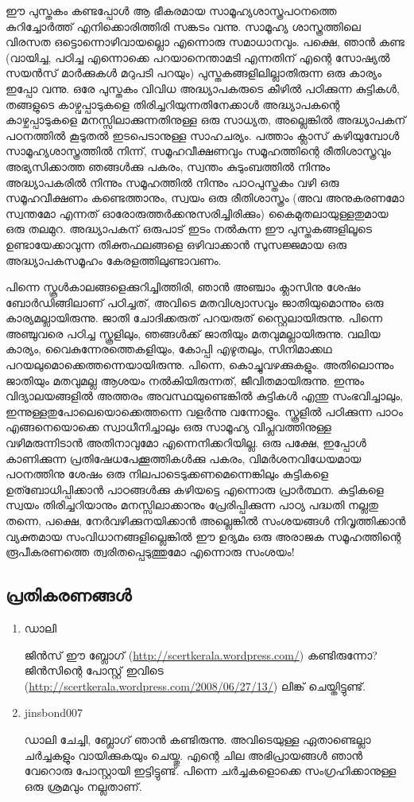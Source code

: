 ഈ പുസ്തകം കണ്ടപ്പോള്‍ ആ ഭീകരമായ സാമൂഹ്യശാസ്ത്രപഠനത്തെ കുറിച്ചോര്‍ത്ത് എനിക്കൊരിത്തിരി സങ്കടം വന്നു. സാമൂഹ്യ ശാസ്ത്രത്തിലെ വിരസത ഒട്ടൊന്നൊഴിവായല്ലൊ 
എന്നൊരു സമാധാനവും. പക്ഷെ, ഞാന്‍ കണ്ട (വായിച്ച, പഠിച്ച എന്നൊക്കെ പറയാനെന്താമടി എന്നതിന് എന്റെ സോഷ്യല്‍ സയന്‍സ് മാര്‍ക്കുകള്‍ മറുപടി പറയും) 
പുസ്തകങ്ങളിലില്ലാതിരുന്ന ഒരു കാര്യം ഇപ്പോ വന്നു. ഒരേ പുസ്തകം വിവിധ അദ്ധ്യാപകരുടെ കീഴില്‍ പഠിക്കുന്ന കുട്ടികള്‍, തങ്ങളുടെ കാഴ്വപ്പാടുകളെ തിരിച്ചറിയുന്നതിനേക്കാള്‍ 
അദ്ധ്യാപകന്റെ കാഴ്ചപ്പാടുകളെ മനസ്സിലാക്കുന്നതിനുള്ള ഒരു സാധ്യത, അല്ലെങ്കില്‍ അദ്ധ്യാപകന് പഠനത്തില്‍ കൂടുതല്‍ ഇടപെടാനുള്ള സാഹചര്യം. പത്താം ക്ലാസ് 
കഴിയുമ്പോള്‍ സാമൂഹ്യശാസ്ത്രത്തില്‍ നിന്ന്, സമൂഹവീക്ഷണവും സമൂഹത്തിന്റെ രീതിശാസ്ത്രവും അഭ്യസിക്കാത്ത ഞങ്ങള്‍ക്കു പകരം, സ്വന്തം കുടുംബത്തില്‍ നിന്നും 
അദ്ധ്യാപകരില്‍ നിന്നും സമൂഹത്തില്‍ നിന്നും പാഠപുസ്തകം വഴി ഒരു സമൂഹവീക്ഷണം കണ്ടെത്താനും, സ്വയം ഒരു രീതിശാസ്ത്രം (അവ അനുകരണമോ സ്വന്തമോ എന്നത് 
ഓരോരുത്തര്‍ക്കനുസരിച്ചിരിക്കും) കൈമുതലായുള്ളതുമായ ഒരു തലമുറ. അദ്ധ്യാപകന് ഒരുപാട് ഇടം നല്‍കുന്ന ഈ പുസ്തകങ്ങളിലൂടെ ഉണ്ടായേക്കാവുന്ന 
തിക്തഫലങ്ങളെ ഒഴിവാക്കാന്‍ സുസജ്ജമായ ഒരു അദ്ധ്യാപകസമൂഹം കേരളത്തിലുണ്ടാവണം.

പിന്നെ സ്കൂള്‍കാലങ്ങളെക്കുറിച്ചിത്തിരി, ഞാന്‍ അഞ്ചാം ക്ലാസിനു ശേഷം ബോര്‍ഡിങ്ങിലാണ് പഠിച്ചത്, അവിടെ മതവിശ്വാസവും ജാതിയുമൊന്നും ഒരു കാര്യമല്ലായിരുന്നു. 
ജാതി ചോദിക്കരുത് പറയരുത് സ്റ്റൈലായിരുന്നു. പിന്നെ അഞ്ചുവരെ പഠിച്ച സ്കൂളിലും, ഞങ്ങള്‍ക്ക് ജാതിയും മതവുമല്ലായിരുന്നു. വലിയ കാര്യം, വൈകുന്നേരത്തെകളിയും, 
കോപ്പി എഴുതലും, സിനിമാക്കഥ പറയലുമൊക്കെത്തന്നെയായിരുന്നു. പിന്നെ, കൊച്ചുവഴക്കുകളും. അതിലൊന്നും ജാതിയും മതവുമല്ല ആശയം നല്‍കിയിരുന്നത്, ജീവിതമായിരുന്നു. 
ഇന്നും വിദ്യാലയങ്ങളില്‍ അത്തരം അവസ്ഥയുണ്ടെങ്കില്‍ കുട്ടികള്‍ എന്തു സംഭവിച്ചാലും, ഇന്നുള്ളതുപോലെയൊക്കെത്തന്നെ വളര്‍ന്നു വന്നോളും. സ്കൂളില്‍ പഠിക്കുന്ന പാഠം 
എങ്ങനെയൊക്കെ സ്വാധീനിച്ചാലും ഒരു സാമൂഹ്യ വിപ്ലവത്തിനുള്ള വഴിമരുന്നിടാന്‍ അതിനാവുമോ എന്നെനിക്കറിയില്ല. ഒരു പക്ഷേ, ഇപ്പോള്‍ കാണിക്കുന്ന 
പ്രതിഷേധപേക്കൂത്തികള്‍ക്കു പകരം, വിമര്‍ശനവിധേയമായ പഠനത്തിനു ശേഷം ഒരു നിലപാടെടുക്കണമെന്നെങ്കിലും കുട്ടികളെ ഉത്ബോധിപ്പിക്കാന്‍ പാഠങ്ങള്‍ക്കു കഴിയട്ടെ 
എന്നൊരു പ്രാര്‍ത്ഥന. കുട്ടികളെ സ്വയം തിരിച്ചറിയാനും മനസ്സിലാക്കാനും പ്രേരിപ്പിക്കുന്ന പാഠ്യ പദ്ധതി നല്ലതു തന്നെ, പക്ഷെ, നേര്‍വഴിക്കുനയിക്കാന്‍ അല്ലെങ്കില്‍ 
സംശയങ്ങള്‍ നിവൃത്തിക്കാന്‍ വ്യക്തമായ സംവിധാനങ്ങളില്ലെങ്കില്‍ ഈ ഉദ്യമം ഒരു അരാജക സമൂഹത്തിന്റെ രൂപീകരണത്തെ ത്വരിതപ്പെടുത്തുമോ എന്നൊരു സംശയം!

\subsection*{പ്രതികരണങ്ങള്‍}

\begin{enumerate}
 \item{ഡാലി}

ജിന്‍സ് ഈ ബ്ലോഗ് (\url{http://scertkerala.wordpress.com/}) കണ്ടിരുന്നോ?  ജിന്‍സിന്റെ പോസ്റ്റ് 
ഇവിടെ (\url{http://scertkerala.wordpress.com/2008/06/27/13/}) ലിങ്ക് ചെയ്തിട്ടുണ്ട്.
\item{jinsbond007}

ഡാലി ചേച്ചി, ബ്ലോഗ് ഞാന്‍ കണ്ടിരുന്നു. അവിടെയുള്ള ഏതാണ്ടെല്ലാ ചര്‍ച്ചകളും വായിക്കുകയും ചെയ്തു. 
എന്റെ ചില അഭിപ്രായങ്ങള്‍ ഞാന്‍ വേറൊരു പോസ്റ്റായി ഇട്ടിട്ടുണ്ട്. പിന്നെ ചര്‍ച്ചകളൊക്കെ സംഗ്രഹിക്കാനുള്ള 
ഒരു ശ്രമവും നല്ലതാണ്.

\end{enumerate}

\newpage
